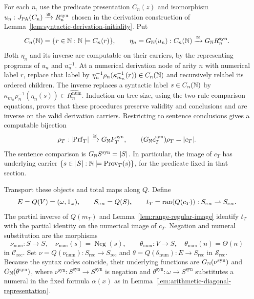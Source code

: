 For each $n$, use the predicate presentation $C_n(z)$ and
isomorphism $u_n:J_{\mathrm{PA}}(C_n)\xrightarrow{\cong}R_n^{\mathrm{syn}}$
chosen in the derivation construction of
Lemma~\ref{lem:syntactic-derivation-initiality}. Put
\[
 C_n(\mathbb N)=\{r\in\mathbb N:\mathbb N\models C_n(r)\},\qquad
 \eta_n=G_{\mathbb N}(u_n):C_n(\mathbb N)\xrightarrow{\cong}
                                      G_{\mathbb N}R_n^{\mathrm{syn}}.
\]
Both $\eta_n$ and its inverse are computable on their carriers,
by the representing programs of $u_n$ and $u_n^{-1}$.
At a numerical derivation node of arity $n$ with numerical label $r$,
replace that label by
$\eta_n^{-1}\rho_n(\kappa_{m_n}^{-1}(r))\in C_n(\mathbb N)$ and
recursively relabel its ordered children. The inverse replaces a
syntactic label $s\in C_n(\mathbb N)$ by
$\kappa_{m_n}\rho_n^{-1}(\eta_n(s))\in\widehat{R_n^{\mathrm{num}}}$.
Induction on tree size, using the two rule
comparison equations, proves that these procedures preserve validity
and conclusions and are inverse on the valid derivation carriers.
Restricting to sentence conclusions gives a computable bijection
\[
 \rho_T:|\mathrm{Prf}_T|\xrightarrow{\cong}G_{\mathbb N}P_T^{\mathrm{syn}},
 \qquad
 (G_{\mathbb N}c_T^{\mathrm{syn}})\rho_T=|c_T|.
\]
The sentence comparison is $G_{\mathbb N}S^{\mathrm{syn}}=|S|$.
In particular, the image of $c_T$ has underlying carrier
$\{s\in|S|:\mathbb N\models\operatorname{Prov}_T(s)\}$, for the
predicate fixed in that section.

Transport these objects and total maps along $Q$.
Define
\[
 E=Q(V)=(\omega,1_\omega),\qquad
 S_{\mathrm{rec}}=Q(S),\qquad
 t_T=\operatorname{ran}(Q(c_T)):S_{\mathrm{rec}}\rightharpoonup S_{\mathrm{rec}}.
\]
The partial inverse of $Q(m_T)$ and
Lemma~\ref{lem:range-regular-image} identify $t_T$ with the partial
identity on the numerical image of $c_T$.
Negation and numeral substitution are the morphisms
\[
 \nu_{\mathrm{num}}:S\to S,\quad
    \nu_{\mathrm{num}}(s)=\operatorname{Neg}(s),\qquad
 \theta_{\mathrm{num}}:V\to S,\quad
    \theta_{\mathrm{num}}(n)=\Theta(n)
\]
in $\mathcal C_{\mathrm{rec}}$. Set
$\nu=Q(\nu_{\mathrm{num}}):S_{\mathrm{rec}}\to S_{\mathrm{rec}}$
and $\theta=Q(\theta_{\mathrm{num}}):E\to S_{\mathrm{rec}}$
in $\mathscr S_{\mathrm{rec}}$.
Because the syntax codes coincide, their underlying functions are
$G_{\mathbb N}(\nu^{\mathrm{syn}})$ and $G_{\mathbb N}(\theta^{\mathrm{syn}})$,
where $\nu^{\mathrm{syn}}:S^{\mathrm{syn}}\to S^{\mathrm{syn}}$ is negation and
$\theta^{\mathrm{syn}}:\omega\to S^{\mathrm{syn}}$ substitutes a numeral
in the fixed formula $\alpha(x)$ as in
Lemma~\ref{lem:arithmetic-diagonal-representation}.

